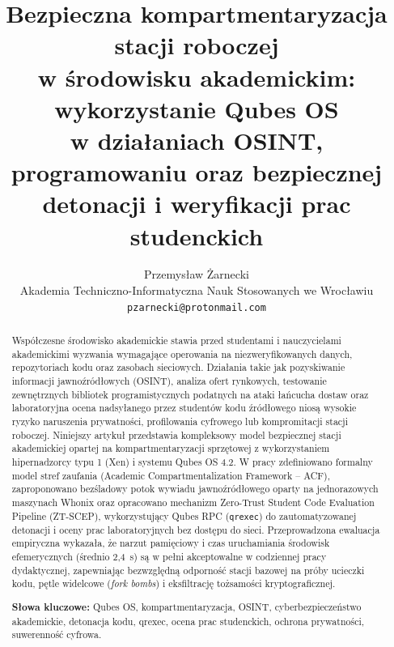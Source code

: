 \documentclass[12pt,a4paper]{article}
\begin{document}
\sloppy

\title{%
  \Large\bfseries
  Bezpieczna kompartmentaryzacja stacji roboczej\\
  w środowisku akademickim: wykorzystanie Qubes OS\\
  w działaniach OSINT, programowaniu oraz bezpiecznej detonacji i weryfikacji prac studenckich%
}
\author{Przemysław Żarnecki\\
  \small Akademia Techniczno-Informatyczna Nauk Stosowanych we Wrocławiu\\
  \small \texttt{pzarnecki@protonmail.com}
}
\date{}
\maketitle

\begin{abstract}
\noindent
Współczesne środowisko akademickie stawia przed studentami i nauczycielami akademickimi wyzwania wymagające operowania na niezweryfikowanych danych, repozytoriach kodu oraz zasobach sieciowych. Działania takie jak pozyskiwanie informacji jawnoźródłowych (OSINT), analiza ofert rynkowych, testowanie zewnętrznych bibliotek programistycznych podatnych na ataki łańcucha dostaw oraz laboratoryjna ocena nadsyłanego przez studentów kodu źródłowego niosą wysokie ryzyko naruszenia prywatności, profilowania cyfrowego lub kompromitacji stacji roboczej. Niniejszy artykuł przedstawia kompleksowy model bezpiecznej stacji akademickiej opartej na kompartmentaryzacji sprzętowej z wykorzystaniem hipernadzorcy typu 1 (Xen) i systemu Qubes OS 4.2. W pracy zdefiniowano formalny model stref zaufania (Academic Compartmentalization Framework -- ACF), zaproponowano bezśladowy potok wywiadu jawnoźródłowego oparty na jednorazowych maszynach Whonix oraz opracowano mechanizm Zero-Trust Student Code Evaluation Pipeline (ZT-SCEP), wykorzystujący Qubes RPC (\texttt{qrexec}) do zautomatyzowanej detonacji i oceny prac laboratoryjnych bez dostępu do sieci. Przeprowadzona ewaluacja empiryczna wykazała, że narzut pamięciowy i czas uruchamiania środowisk efemerycznych (średnio 2,4~s) są w pełni akceptowalne w codziennej pracy dydaktycznej, zapewniając bezwzględną odporność stacji bazowej na próby ucieczki kodu, pętle widelcowe (\textit{fork bombs}) i eksfiltrację tożsamości kryptograficznej.

\medskip
\noindent
\textbf{Słowa kluczowe:} Qubes OS, kompartmentaryzacja, OSINT, cyberbezpieczeństwo akademickie, detonacja kodu, qrexec, ocena prac studenckich, ochrona prywatności, suwerenność cyfrowa.
\end{abstract}









\begin{singlespace}
\printbibliography[title={Bibliografia}]
\end{singlespace}
\end{document}
